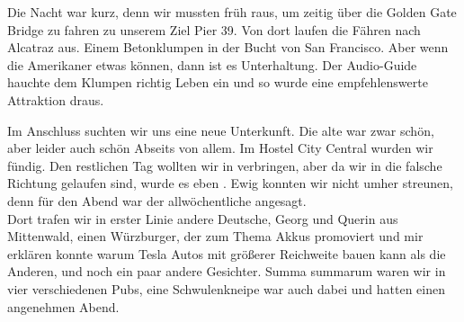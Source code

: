 Die Nacht war kurz, denn wir mussten früh raus, um zeitig über die Golden Gate Bridge zu fahren zu unserem Ziel Pier 39.
Von dort laufen die Fähren nach Alcatraz aus.
Einem Betonklumpen in der Bucht von San Francisco.
Aber wenn die Amerikaner etwas können, dann ist es Unterhaltung.
Der Audio-Guide hauchte dem Klumpen richtig Leben ein und so wurde eine empfehlenswerte Attraktion draus.

\newpage
\thispagestyle{empty}
\newpage

Im Anschluss suchten wir uns eine neue Unterkunft.
Die alte war zwar schön, aber leider auch schön Abseits von allem.
Im Hostel City Central wurden wir fündig.
Den restlichen Tag wollten wir in  verbringen, aber da wir in die falsche Richtung gelaufen sind, wurde es eben .
Ewig konnten wir nicht umher streunen, denn für den Abend war der allwöchentliche  angesagt.\\

Dort trafen wir in erster Linie andere Deutsche, Georg und Querin aus Mittenwald, einen Würzburger, der zum Thema Akkus promoviert und mir erklären konnte warum Tesla Autos mit größerer Reichweite bauen kann als die Anderen, und noch ein paar andere Gesichter.
Summa summarum waren wir in vier verschiedenen Pubs, eine Schwulenkneipe war auch dabei und hatten einen angenehmen Abend.


%
